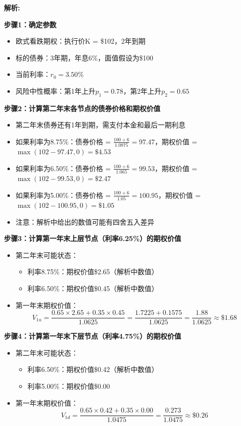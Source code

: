 \documentclass{article}
\newenvironment{explanation}
{\textbf{解析:}\par}
{\par}
\begin{document}
\begin{explanation}
    \textbf{步骤1：确定参数}
    \begin{itemize}
        \item 欧式看跌期权：执行价K = \$102，2年到期
        \item 标的债券：3年期，年息6\%，面值假设为\$100
        \item 当前利率：$r_0 = 3.50\%$
        \item 风险中性概率：第1年上升$p_1 = 0.78$，第2年上升$p_2 = 0.65$
    \end{itemize}

    \textbf{步骤2：计算第二年末各节点的债券价格和期权价值}
    \begin{itemize}
        \item 第二年末债券还有1年到期，需支付本金和最后一期利息
        \item 如果利率为8.75\%：债券价格 = $\frac{100 + 6}{1.0875} = 97.47$，期权价值 = $\max(102 - 97.47, 0) = \$4.53$
        \item 如果利率为6.50\%：债券价格 = $\frac{100 + 6}{1.065} = 99.53$，期权价值 = $\max(102 - 99.53, 0) = \$2.47$
        \item 如果利率为5.00\%：债券价格 = $\frac{100 + 6}{1.05} = 100.95$，期权价值 = $\max(102 - 100.95, 0) = \$1.05$
        \item 注意：解析中给出的数值可能有四舍五入差异
    \end{itemize}

    \textbf{步骤3：计算第一年末上层节点（利率6.25\%）的期权价值}
    \begin{itemize}
        \item 第二年末可能状态：
        \begin{itemize}
            \item 利率8.75\%：期权价值\$2.65（解析中数值）
            \item 利率6.50\%：期权价值\$0.45（解析中数值）
        \end{itemize}
        \item 第一年末期权价值：
        \[
        V_{1u} = \frac{0.65 \times 2.65 + 0.35 \times 0.45}{1.0625} = \frac{1.7225 + 0.1575}{1.0625} = \frac{1.88}{1.0625} \approx \$1.68
        \]
    \end{itemize}

    \textbf{步骤4：计算第一年末下层节点（利率4.75\%）的期权价值}
    \begin{itemize}
        \item 第二年末可能状态：
        \begin{itemize}
            \item 利率6.50\%：期权价值\$0.42（解析中数值）
            \item 利率5.00\%：期权价值\$0.00
        \end{itemize}
        \item 第一年末期权价值：
        \[
        V_{1d} = \frac{0.65 \times 0.42 + 0.35 \times 0.00}{1.0475} = \frac{0.273}{1.0475} \approx \$0.26
        \]
    \end{itemize}


\end{explanation}
\end{document}
